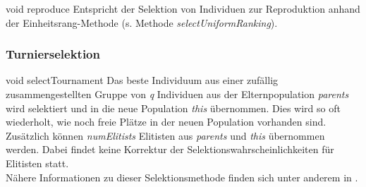 \documentclass{report}
\begin{document}
\vspace{4ex}

\setNormalInstance
\setCorrectWidthThree{8pt}
\printMethodWithParamsSaved
{void}
{}
{reproduce}
{Entspricht der Selektion von Individuen zur Reproduktion anhand der
 Einheitsrang-Methode (s. Methode {\em selectUniformRanking}).}
{}
\setCorrectWidthThree{4pt}

\newpage

\subsubsection{Turnierselektion}

\setNormalInstance
\setCorrectWidthThree{8pt}
\printMethodWithParamsSaved
{void}
{}
{selectTournament}
{Das beste Individuum aus einer zuf\"allig zusammengestellten Gruppe von 
 {\em q} Individuen aus der Elternpopulation {\em parents} wird selektiert
 und in die neue Population {\em this} \"ubernommen. Dies wird so oft
 wiederholt, wie noch freie Pl\"atze in der neuen Population vorhanden
 sind. Zus\"atzlich k\"onnen {\em numElitists} Elitisten aus {\em parents} 
 und {\em this} \"ubernommen werden. Dabei findet keine Korrektur der
 Selektionswahrscheinlichkeiten f\"ur Elitisten statt.\\
 N\"ahere Informationen zu dieser Selektionsmethode finden sich unter
 anderem in \cite{Goldberg}.}
{}
\setCorrectWidthThree{4pt}

\vspace{4ex}
\end{document}
